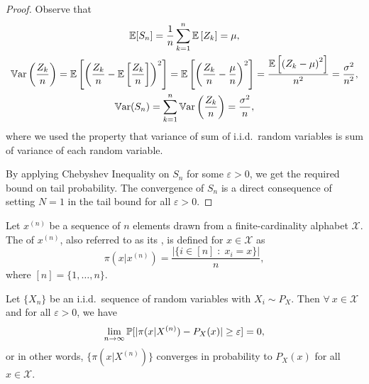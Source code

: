 \documentclass[11pt,a4paper]{article}
\begin{document}
\begin{proof}
    Observe that 
    \begin{gather*}
        \mathbb{E}[S_n] = \dfrac{1}{n}\sum_{k=1}^n \mathbb{E}\left[ Z_k \right] = \mu, \\
        \mathbb{V}\text{ar}\left(\dfrac{Z_k}{n}\right) = \mathbb{E}\left[\left( \dfrac{Z_k}{n} - \mathbb{E}\left[ \dfrac{Z_k}{n} \right]\right)^2 \right] = \mathbb{E}\left[\left( \dfrac{Z_k}{n} - \dfrac{\mu}{n} \right)^2\right] = \dfrac{\mathbb{E}\left[\left( Z_k - \mu \right)^2\right]}{n^2} = \dfrac{\sigma^2}{n^2}, \\
        \mathbb{V}\text{ar}(S_n) = \sum_{k=1}^{n} \mathbb{V}\text{ar}\left(\dfrac{Z_k}{n}\right) = \dfrac{\sigma^2}{n},
    \end{gather*}
    where we used the property that variance of sum of i.i.d.~random variables is sum of variance of each random variable.

    By applying Chebyshev Inequality on $S_n$ for some $\varepsilon > 0$, we get the required bound on tail probability. The convergence of $S_n$ is a direct consequence of setting $N = 1$ in the tail bound for all $\varepsilon > 0$.
\end{proof}

\begin{definition}
    Let $x^{(n)}$ be a sequence of $n$ elements drawn from a finite-cardinality alphabet $\mathcal{X}$. The  of $x^{(n)}$, also referred to as its , is defined for $x\in \mathcal{X}$ as
    \begin{equation*}
        \pi(x|x^{(n)}) = \dfrac{|\{i\in [n]\;:\;x_i = x\}|}{n}, 
    \end{equation*}
    where $[n] = \{1,\ldots, n\}$.
\end{definition}

\begin{theorem}
    Let $\{X_n\}$ be an i.i.d.~sequence of random variables with $X_i\sim P_X$. Then $\forall\ x\in\mathcal{X}$ and for all $\varepsilon>0$, we have
    \begin{equation*}
        \lim_{n\rightarrow \infty} \mathbb{P}[|\pi(x|X^{(n)}) - P_X(x)| \ge \varepsilon] = 0, 
    \end{equation*}
    or in other words, $\{\pi(x|X^{(n)})\}$ converges in probability to $P_X(x)$ for all $x\in\mathcal{X}$.
\end{theorem}
\end{document}
